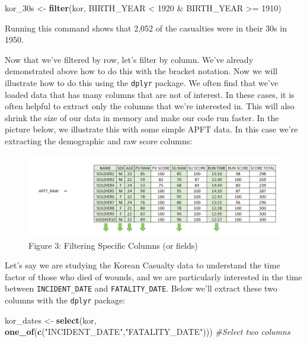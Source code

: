 \documentclass[]{book}
\newenvironment{Shaded}{\begin{snugshade}}{\end{snugshade}}
\newcommand{\KeywordTok}[1]{\textcolor[rgb]{0.13,0.29,0.53}{\textbf{{#1}}}}
\newcommand{\DecValTok}[1]{\textcolor[rgb]{0.00,0.00,0.81}{{#1}}}
\newcommand{\StringTok}[1]{\textcolor[rgb]{0.31,0.60,0.02}{{#1}}}
\newcommand{\CommentTok}[1]{\textcolor[rgb]{0.56,0.35,0.01}{\textit{{#1}}}}
\newcommand{\NormalTok}[1]{{#1}}
\begin{document}
\begin{Shaded}
\begin{Highlighting}[]
\NormalTok{kor_30s <-}\StringTok{ }\KeywordTok{filter}\NormalTok{(kor, BIRTH_YEAR <}\StringTok{ }\DecValTok{1920} \NormalTok{&}\StringTok{ }\NormalTok{BIRTH_YEAR >=}\StringTok{ }\DecValTok{1910}\NormalTok{)}
\end{Highlighting}
\end{Shaded}

Running this command shows that 2,052 of the casualties were in their
30s in 1950.

Now that we've filtered by row, let's filter by column. We've already
demonstrated above how to do this with the bracket notation. Now we will
illustrate how to do this using the \texttt{dplyr} package. We often
find that we've loaded data that has many columns that are not of
interest. In these cases, it is often helpful to extract only the
columns that we're interested in. This will also shrink the size of our
data in memory and make our code run faster. In the picture below, we
illustrate this with some simple APFT data. In this case we're
extracting the demographic and raw score columns:

\begin{figure}[htbp]
\centering
\includegraphics{filterColumn.PNG}
\caption{Figure 3: Filtering Specific Columns (or fields)}
\end{figure}

Let's say we are studying the Korean Casualty data to understand the
time factor of those who died of wounds, and we are particularly
interested in the time between \texttt{INCIDENT\_DATE} and
\texttt{FATALITY\_DATE}. Below we'll extract these two columns with the
\texttt{dplyr} package:

\begin{Shaded}
\begin{Highlighting}[]
\NormalTok{kor_dates <-}\StringTok{ }\KeywordTok{select}\NormalTok{(kor, }\KeywordTok{one_of}\NormalTok{(}\KeywordTok{c}\NormalTok{(}\StringTok{"INCIDENT_DATE"}\NormalTok{,}\StringTok{"FATALITY_DATE"}\NormalTok{))) }\CommentTok{#Select two columns}
\end{Highlighting}
\end{Shaded}
\end{document}
